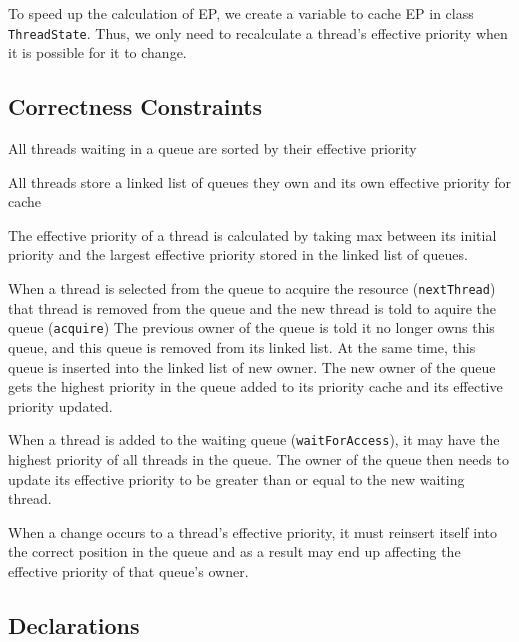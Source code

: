 \documentclass{article}
\begin{document}
\begin{spacing}{1.1}
To speed up the calculation of EP, we create a variable to cache EP in class \texttt{ThreadState}. Thus, we only need to recalculate a thread's effective priority when it is possible for it to change.

\subsection{Correctness Constraints}

\begin{asparaitem}
\item All threads waiting in a queue are sorted by their effective priority\\
\item All threads store a linked list of queues they own and its own effective priority for cache\\
\item The effective priority of a thread is calculated by taking max between its initial priority and the largest effective priority stored in the linked list of queues.\\
\item When a thread is selected from the queue to acquire the resource (\texttt{nextThread}) that thread is removed from the queue and the new thread is told to aquire the queue (\texttt{acquire}) The previous owner of the queue is told it no longer owns this queue, and this queue is removed from its linked list. At the same time, this queue is inserted into the linked list of new owner. The new owner of the queue gets the highest priority in the queue added to its priority cache and its effective priority updated. \\
\item When a thread is added to the waiting queue (\texttt{waitForAccess}), it may have the highest priority of all threads in the queue. The owner of the queue then needs to update its effective priority to be greater than or equal to the new waiting thread.\\
\item When a change occurs to a thread's effective priority, it must reinsert itself into the correct position in the queue and as a result may end up affecting the effective priority of that queue's owner.
\end{asparaitem}

\subsection{Declarations}


\end{spacing}
\end{document}

